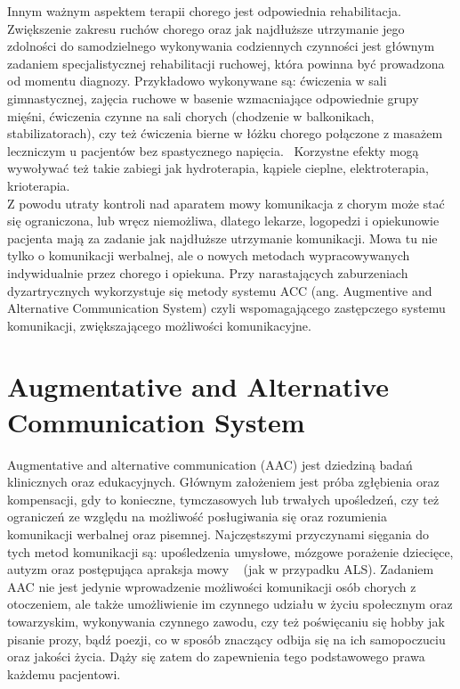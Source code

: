 \documentclass[twoside,a4paper]{book}
\begin{document}
Innym ważnym aspektem terapii chorego jest odpowiednia rehabilitacja. Zwiększenie zakresu ruchów chorego oraz jak najdłuższe utrzymanie jego zdolności do samodzielnego wykonywania codziennych czynności jest głównym zadaniem specjalistycznej rehabilitacji ruchowej, która powinna być prowadzona od momentu diagnozy. Przykładowo wykonywane są: ćwiczenia w sali gimnastycznej, zajęcia ruchowe w basenie wzmacniające odpowiednie grupy mięśni, ćwiczenia czynne na sali chorych (chodzenie w balkonikach, stabilizatorach), czy też ćwiczenia bierne w łóżku chorego połączone z masażem leczniczym u pacjentów bez spastycznego napięcia.~\cite{alsAdamek} Korzystne efekty mogą wywoływać też takie zabiegi jak hydroterapia, kąpiele cieplne, elektroterapia, krioterapia. ~\cite{poradnik}\\
Z powodu utraty kontroli nad aparatem mowy komunikacja z chorym może stać się ograniczona, lub wręcz niemożliwa, dlatego lekarze, logopedzi i opiekunowie pacjenta mają za zadanie jak najdłuższe utrzymanie komunikacji.  Mowa tu nie tylko o komunikacji werbalnej, ale o nowych metodach wypracowywanych  indywidualnie przez chorego i opiekuna. 
Przy  narastających  zaburzeniach  dyzartrycznych  wykorzystuje  się metody  systemu  ACC  (ang.  Augmentive  and  Alternative  Communication  System)  czyli  wspomagającego  zastępczego  systemu  komunikacji,  zwiększającego możliwości komunikacyjne.~\cite{alsAdamek}

\section{Augmentative and Alternative Communication System}


Augmentative and alternative communication (AAC) jest dziedziną badań kli\-ni\-cznych oraz edukacyjnych. Głównym założeniem jest próba zgłębienia oraz kompensacji, gdy to konieczne, tymczasowych lub trwałych upośledzeń, czy też ograniczeń ze względu na możliwość posługiwania się oraz rozumienia komunikacji werbalnej oraz pisemnej.  Najczęstszymi przyczynami sięgania do tych metod komunikacji są: upośledzenia umysłowe, mózgowe porażenie dziecięce, autyzm oraz postępująca apraksja mowy ~\cite{augmentative} (jak w przypadku ALS). Zadaniem AAC nie jest jedynie wprowadzenie możliwości komunikacji osób chorych z otoczeniem, ale także umożliwienie im czynnego udziału w życiu społecznym oraz towarzyskim, wykonywania czynnego zawodu, czy też poświęcaniu się hobby jak pisanie prozy, bądź poezji, co w sposób znaczący odbija się na ich samopoczuciu oraz jakości życia. Dąży się zatem do zapewnienia tego podstawowego prawa każdemu pacjentowi. 
\end{document}
